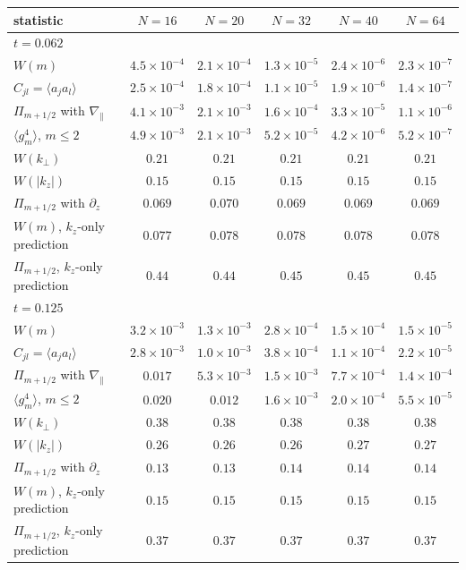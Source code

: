 \begin{tabular}{lccccc}
\toprule
statistic & $N=16$ & $N=20$ & $N=32$ & $N=40$ & $N=64$ \\
\midrule
\multicolumn{6}{l}{$t=0.062$} \\
\midrule
$W(m)$ & $4.5\times10^{-4}$ & $2.1\times10^{-4}$ & $1.3\times10^{-5}$ & $2.4\times10^{-6}$ & $2.3\times10^{-7}$ \\
$C_{jl}=\langle a_ja_l\rangle$ & $2.5\times10^{-4}$ & $1.8\times10^{-4}$ & $1.1\times10^{-5}$ & $1.9\times10^{-6}$ & $1.4\times10^{-7}$ \\
$\Pi_{m+1/2}$ with $\nabla_\parallel$ & $4.1\times10^{-3}$ & $2.1\times10^{-3}$ & $1.6\times10^{-4}$ & $3.3\times10^{-5}$ & $1.1\times10^{-6}$ \\
$\langle g_m^4\rangle$, $m\le2$ & $4.9\times10^{-3}$ & $2.1\times10^{-3}$ & $5.2\times10^{-5}$ & $4.2\times10^{-6}$ & $5.2\times10^{-7}$ \\
\addlinespace
$W(k_\perp)$ & $0.21$ & $0.21$ & $0.21$ & $0.21$ & $0.21$ \\
$W(|k_z|)$ & $0.15$ & $0.15$ & $0.15$ & $0.15$ & $0.15$ \\
$\Pi_{m+1/2}$ with $\partial_z$ & $0.069$ & $0.070$ & $0.069$ & $0.069$ & $0.069$ \\
\addlinespace
$W(m)$, $k_z$-only prediction & $0.077$ & $0.078$ & $0.078$ & $0.078$ & $0.078$ \\
$\Pi_{m+1/2}$, $k_z$-only prediction & $0.44$ & $0.44$ & $0.45$ & $0.45$ & $0.45$ \\
\midrule
\multicolumn{6}{l}{$t=0.125$} \\
\midrule
$W(m)$ & $3.2\times10^{-3}$ & $1.3\times10^{-3}$ & $2.8\times10^{-4}$ & $1.5\times10^{-4}$ & $1.5\times10^{-5}$ \\
$C_{jl}=\langle a_ja_l\rangle$ & $2.8\times10^{-3}$ & $1.0\times10^{-3}$ & $3.8\times10^{-4}$ & $1.1\times10^{-4}$ & $2.2\times10^{-5}$ \\
$\Pi_{m+1/2}$ with $\nabla_\parallel$ & $0.017$ & $5.3\times10^{-3}$ & $1.5\times10^{-3}$ & $7.7\times10^{-4}$ & $1.4\times10^{-4}$ \\
$\langle g_m^4\rangle$, $m\le2$ & $0.020$ & $0.012$ & $1.6\times10^{-3}$ & $2.0\times10^{-4}$ & $5.5\times10^{-5}$ \\
\addlinespace
$W(k_\perp)$ & $0.38$ & $0.38$ & $0.38$ & $0.38$ & $0.38$ \\
$W(|k_z|)$ & $0.26$ & $0.26$ & $0.26$ & $0.27$ & $0.27$ \\
$\Pi_{m+1/2}$ with $\partial_z$ & $0.13$ & $0.13$ & $0.14$ & $0.14$ & $0.14$ \\
\addlinespace
$W(m)$, $k_z$-only prediction & $0.15$ & $0.15$ & $0.15$ & $0.15$ & $0.15$ \\
$\Pi_{m+1/2}$, $k_z$-only prediction & $0.37$ & $0.37$ & $0.37$ & $0.37$ & $0.37$ \\
\bottomrule
\end{tabular}
